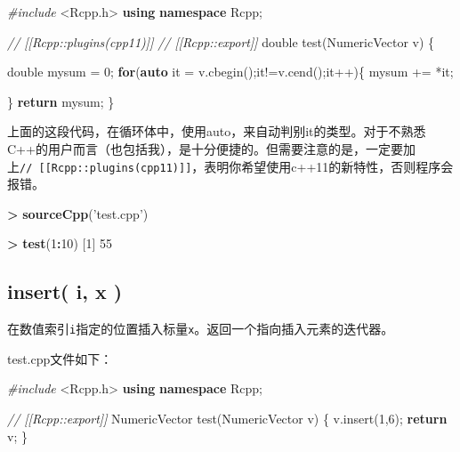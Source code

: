 \documentclass[]{ctexbook}
\newenvironment{Shaded}{\begin{snugshade}}{\end{snugshade}}
\newcommand{\KeywordTok}[1]{\textcolor[rgb]{0.13,0.29,0.53}{\textbf{#1}}}
\newcommand{\DataTypeTok}[1]{\textcolor[rgb]{0.13,0.29,0.53}{#1}}
\newcommand{\DecValTok}[1]{\textcolor[rgb]{0.00,0.00,0.81}{#1}}
\newcommand{\StringTok}[1]{\textcolor[rgb]{0.31,0.60,0.02}{#1}}
\newcommand{\ImportTok}[1]{#1}
\newcommand{\CommentTok}[1]{\textcolor[rgb]{0.56,0.35,0.01}{\textit{#1}}}
\newcommand{\ControlFlowTok}[1]{\textcolor[rgb]{0.13,0.29,0.53}{\textbf{#1}}}
\newcommand{\OperatorTok}[1]{\textcolor[rgb]{0.81,0.36,0.00}{\textbf{#1}}}
\newcommand{\PreprocessorTok}[1]{\textcolor[rgb]{0.56,0.35,0.01}{\textit{#1}}}
\newcommand{\NormalTok}[1]{#1}
\begin{document}
\begin{Shaded}
\begin{Highlighting}[]
\PreprocessorTok{#include }\ImportTok{<Rcpp.h>}
\KeywordTok{using} \KeywordTok{namespace}\NormalTok{ Rcpp;}

\CommentTok{// [[Rcpp::plugins(cpp11)]]}
\CommentTok{// [[Rcpp::export]]}
\DataTypeTok{double}\NormalTok{ test(NumericVector v) \{}
  
  \DataTypeTok{double}\NormalTok{ mysum = }\DecValTok{0}\NormalTok{;}
  \ControlFlowTok{for}\NormalTok{(}\KeywordTok{auto}\NormalTok{ it = v.cbegin();it!=v.cend();it++)\{}
\NormalTok{    mysum += *it;}
    
\NormalTok{  \}}
  \ControlFlowTok{return}\NormalTok{ mysum;}
\NormalTok{\}}
\end{Highlighting}
\end{Shaded}

上面的这段代码，在循环体中，使用auto，来自动判别it的类型。对于不熟悉C++的用户而言（也包括我），是十分便捷的。但需要注意的是，一定要加上\texttt{//\ {[}{[}Rcpp::plugins(cpp11){]}{]}}，表明你希望使用c++11的新特性，否则程序会报错。

\begin{Shaded}
\begin{Highlighting}[]
\OperatorTok{>}\StringTok{ }\KeywordTok{sourceCpp}\NormalTok{(}\StringTok{'test.cpp'}\NormalTok{)}

\OperatorTok{>}\StringTok{ }\KeywordTok{test}\NormalTok{(}\DecValTok{1}\OperatorTok{:}\DecValTok{10}\NormalTok{)}
\NormalTok{[}\DecValTok{1}\NormalTok{] }\DecValTok{55}
\end{Highlighting}
\end{Shaded}

\subsection{insert( i, x )}\label{inserti}

在数值索引\texttt{i}指定的位置插入标量\texttt{x}。返回一个指向插入元素的迭代器。

test.cpp文件如下：

\begin{Shaded}
\begin{Highlighting}[]
\PreprocessorTok{#include }\ImportTok{<Rcpp.h>}
\KeywordTok{using} \KeywordTok{namespace}\NormalTok{ Rcpp;}

\CommentTok{// [[Rcpp::export]]}
\NormalTok{NumericVector test(NumericVector v) \{}
\NormalTok{  v.insert(}\DecValTok{1}\NormalTok{,}\DecValTok{6}\NormalTok{);}
  \ControlFlowTok{return}\NormalTok{ v;}
\NormalTok{\}}
\end{Highlighting}
\end{Shaded}
\end{document}
